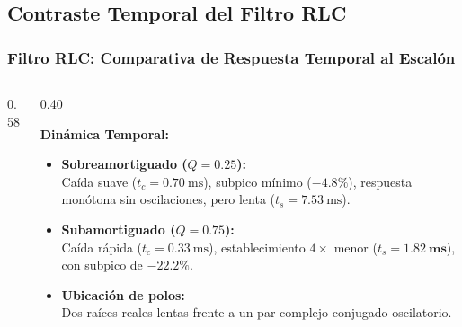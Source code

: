 \subsection{Contraste Temporal del Filtro RLC}
\begin{frame}
  \frametitle{Filtro RLC: Comparativa de Respuesta Temporal al Escalón}

  \begin{columns}[c, onlytextwidth]
    \begin{column}{0.58\textwidth}
      \centering
    \end{column}

    \begin{column}{0.40\textwidth}
      \begin{tarjeta}
        {\fontsize{8.5pt}{10pt}\selectfont \textbf{\color{NavyDark} Dinámica Temporal:}}\\[2pt]
        {\fontsize{7.2pt}{8.8pt}\selectfont
        \begin{itemize}\setlength{\itemsep}{3pt}
          \item \textbf{Sobreamortiguado ($Q = 0.25$):}\\
          Caída suave ($t_c = \qty{0.70}{\milli\second}$), subpico mínimo ($\mathbf{-4.8\%}$), respuesta monótona sin oscilaciones, pero lenta ($t_s = \qty{7.53}{\milli\second}$).
          \item \textbf{Subamortiguado ($Q = 0.75$):}\\
          Caída rápida ($t_c = \qty{0.33}{\milli\second}$), establecimiento $4\times$ menor ($t_s = \mathbf{\qty{1.82}{\milli\second}}$), con subpico de $\mathbf{-22.2\%}$.
          \item \textbf{Ubicación de polos:}\\
          Dos raíces reales lentas frente a un par complejo conjugado oscilatorio.
        \end{itemize}
        }
      \end{tarjeta}
    \end{column}
  \end{columns}
\end{frame}

